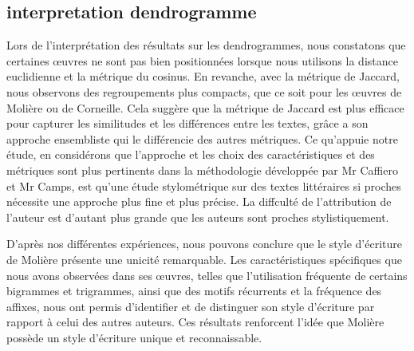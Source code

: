 \documentclass[]{report}
\begin{document}
\subsection{interpretation dendrogramme}

Lors de l'interprétation des résultats sur les dendrogrammes, nous constatons
que certaines œuvres ne sont pas bien positionnées lorsque nous utilisons la
distance euclidienne et la métrique du cosinus. En revanche, avec la métrique de
Jaccard, nous observons des regroupements plus compacts, que ce soit pour les
œuvres de Molière ou de Corneille. Cela suggère que la métrique de Jaccard est
plus efficace pour capturer les similitudes et les différences entre les textes,
grâce a son approche ensembliste qui le différencie des autres métriques. 
Ce qu'appuie notre étude, en considérons que
l'approche et les choix des caractéristiques et des métriques sont plus pertinents
dans la méthodologie développée par Mr Caffiero et Mr Camps, est qu'une étude
stylométrique sur des textes littéraires si proches nécessite une approche plus
fine et plus précise. La diffculté de l'attribution de l'auteur est d'autant
plus grande que les auteurs sont proches stylistiquement.

\vspace{\baselineskip} 
\hspace{0,5cm} D'après nos différentes expériences, nous
pouvons conclure que le style d'écriture de Molière présente une unicité
remarquable. Les caractéristiques spécifiques que nous avons observées dans ses
œuvres, telles que l'utilisation fréquente de certains bigrammes et trigrammes,
ainsi que des motifs récurrents et la fréquence des affixes, nous ont
permis d'identifier et de distinguer son style d'écriture par rapport à celui
des autres auteurs. Ces résultats renforcent l'idée que Molière possède un style
d'écriture unique et reconnaissable.
\end{document}
